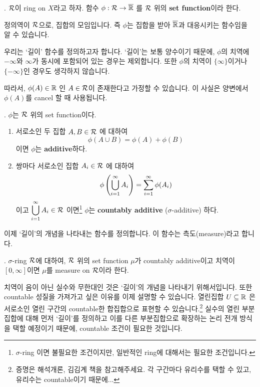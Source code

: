 .  \(\mathcal{R}\)이 ring on \(X\)라고 하자. 함수 \(\phi : \mathcal{R} \rightarrow \overline{\mathbb{R}}\) 를 \(\mathcal{R}\) 위의 \textbf{set function}이라 한다.

정의역이 \(\mathcal{R}\)으로, 집합의 모임입니다. 즉 \(\phi\)는 집합을 받아 \(\overline{\mathbb{R}}\)과 대응시키는 함수임을 알 수 있습니다.

우리는 `길이' 함수를 정의하고자 합니다. `길이'는 보통 양수이기 때문에, \(\phi\)의 치역에 \(-\infty\)와 \(\infty\)가 동시에 포함되어 있는 경우는 제외합니다. 또한 \(\phi\)의 치역이 \(\{\infty\}\)이거나 \(\{-\infty\}\)인 경우도 생각하지 않습니다.

따라서, \(\phi(A) \in \mathbb{R}\) 인 \(A \in \mathcal{R}\)이 존재한다고 가정할 수 있습니다. 이 사실은 양변에서 \(\phi(A)\)를 cancel 할 때 사용됩니다.

. \(\phi\)는 \(\mathcal{R}\) 위의 set function이다.
\begin{enumerate}
    \item 서로소인 두 집합 \(A, B \in \mathcal{R}\) 에 대하여
          \[
              \phi(A\cup B) = \phi(A) + \phi(B)
          \]
          이면 \(\phi\)는 \textbf{additive}하다.

    \item 쌍마다 서로소인 집합 \(A_i \in \mathcal{R}\) 에 대하여
          \[
              \phi\left( \bigcup_{i=1}^\infty A_i \right) = \sum_{i=1}^\infty \phi(A_i)
          \]
          이고 \(\displaystyle \bigcup_{i=1}^\infty A_i \in \mathcal{R}\) 이면\footnote{\(\sigma\)-ring 이면 불필요한 조건이지만, 일반적인 ring에 대해서는 필요한 조건입니다.} \(\phi\)는 \textbf{countably additive} (\(\sigma\)-additive) 하다.
\end{enumerate}

이제 `길이'의 개념을 나타내는 함수를 정의합니다. 이 함수는 측도(measure)라고 합니다.

.  \(\sigma\)-ring \(\mathcal{R}\)에 대하여, \(\mathcal{R}\) 위의 set function \(\mu\)가 countably additive이고 치역이 \([0, \infty]\)이면 \(\mu\)를 measure on \(\mathcal{R}\)이라 한다.

치역이 음이 아닌 실수와 무한대인 것은 `길이'의 개념을 나타내기 위해서입니다. 또한 countable 성질을 가져가고 싶은 이유를 이제 설명할 수 있습니다. 열린집합 \(U \subseteq \mathbb{R}\) 은 서로소인 열린 구간의 countable한 합집합으로 표현할 수 있습니다.\footnote{증명은 해석개론, 김김계 책을 참고해주세요. 각 구간마다 유리수를 택할 수 있고, 유리수는 countable이기 때문에...} 실수의 열린 부분집합에 대해 먼저 `길이'를 정의하고 이를 다른 부분집합으로 확장하는 논리 전개 방식을 택할 예정이기 때문에, countable 조건이 필요한 것입니다.

